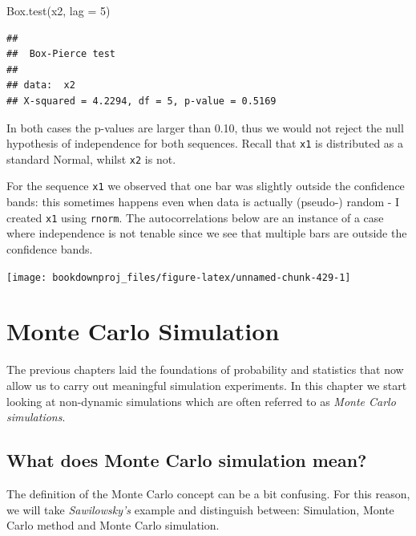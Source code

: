 \documentclass[
]{book}
\newenvironment{Shaded}{\begin{snugshade}}{\end{snugshade}}
\newcommand{\AttributeTok}[1]{\textcolor[rgb]{0.77,0.63,0.00}{#1}}
\newcommand{\DecValTok}[1]{\textcolor[rgb]{0.00,0.00,0.81}{#1}}
\newcommand{\FunctionTok}[1]{\textcolor[rgb]{0.00,0.00,0.00}{#1}}
\newcommand{\NormalTok}[1]{#1}
\begin{document}
\begin{Shaded}
\begin{Highlighting}[]
\FunctionTok{Box.test}\NormalTok{(x2, }\AttributeTok{lag =} \DecValTok{5}\NormalTok{)}
\end{Highlighting}
\end{Shaded}

\begin{verbatim}
## 
##  Box-Pierce test
## 
## data:  x2
## X-squared = 4.2294, df = 5, p-value = 0.5169
\end{verbatim}

In both cases the p-values are larger than 0.10, thus we would not reject the null hypothesis of independence for both sequences. Recall that \texttt{x1} is distributed as a standard Normal, whilst \texttt{x2} is not.

For the sequence \texttt{x1} we observed that one bar was slightly outside the confidence bands: this sometimes happens even when data is actually (pseudo-) random - I created \texttt{x1} using \texttt{rnorm}. The autocorrelations below are an instance of a case where independence is not tenable since we see that multiple bars are outside the confidence bands.

\begin{center}\texttt{[image: bookdownproj\_files/figure-latex/unnamed-chunk-429-1]} \end{center}

\hypertarget{monte-carlo-simulation}{%
\chapter{Monte Carlo Simulation}\label{monte-carlo-simulation}}

The previous chapters laid the foundations of probability and statistics that now allow us to carry out meaningful simulation experiments. In this chapter we start looking at non-dynamic simulations which are often referred to as \emph{Monte Carlo simulations}.

\hypertarget{what-does-monte-carlo-simulation-mean}{%
\section{What does Monte Carlo simulation mean?}\label{what-does-monte-carlo-simulation-mean}}

The definition of the Monte Carlo concept can be a bit confusing. For this reason, we will take \emph{Sawilowsky's} example and distinguish between: Simulation, Monte Carlo method and Monte Carlo simulation.
\end{document}
